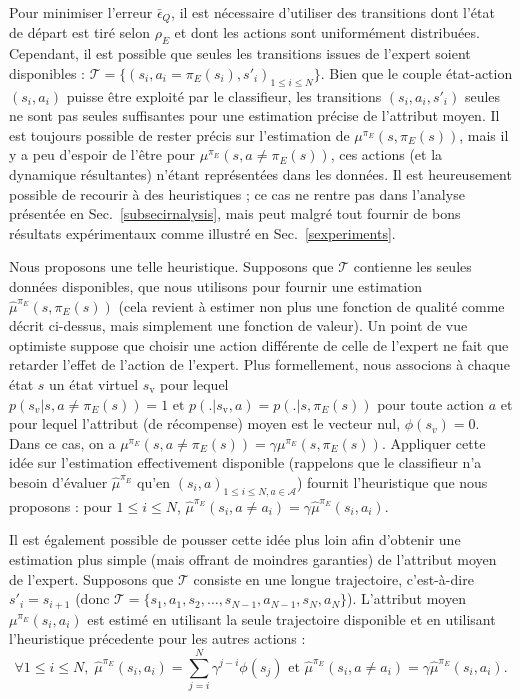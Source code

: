 \documentclass[french,utf8]{./hermes-journal}
\newcommand{\A}{\mathcal{A}}
\newcommand{\T}{\mathcal{T}}
\begin{document}
Pour minimiser l'erreur $\bar{\epsilon}_Q$, il est nécessaire d'utiliser des transitions dont l'état de départ est tiré selon 
$\rho_E$ et dont les actions sont uniformément distribuées. Cependant, il est possible que seules les transitions issues de l'expert soient disponibles : $\T =
\{(s_i,a_i=\pi_E(s_i),s'_i)_{1\leq i \leq N}\}$. Bien que le couple état-action $(s_i,a_i)$ puisse être exploité par le classifieur, les transitions $(s_i,a_i,s'_i)$ seules ne sont pas seules suffisantes pour une estimation précise de l'attribut moyen. Il est toujours possible de rester précis sur l'estimation de $\mu^{\pi_E}(s,\pi_E(s))$, mais il y a peu d'espoir de l'être pour $\mu^{\pi_E}(s,a\neq\pi_E(s))$, ces actions (et la dynamique résultantes) n'étant représentées dans les données. Il est heureusement possible de recourir à des heuristiques ; ce cas ne rentre pas dans l'analyse présentée en 
Sec.~\ref{subsecirnalysis}, mais peut malgré tout fournir de bons résultats expérimentaux comme illustré en Sec.~\ref{sexperiments}.


Nous proposons une telle heuristique. Supposons que  $\T$ contienne les seules données disponibles, que nous utilisons pour fournir une estimation 
$\hat{\mu}^{\pi_E}(s,\pi_E(s))$ (cela revient à estimer non plus une fonction de qualité comme décrit ci-dessus, mais simplement une fonction de valeur). Un point de vue optimiste suppose que choisir une action différente de celle de l'expert ne fait que retarder l'effet de l'action de l'expert. Plus formellement, nous associons à chaque état $s$ un état virtuel $s_\text{v}$ pour lequel $p(s_v|s,a\neq \pi_E(s))=1 \textrm{ et } p(.|s_\text{v},a)=p(.|s,\pi_E(s))$ pour toute action $a$ et pour lequel l'attribut (de récompense) moyen est le vecteur nul, $\phi(s_v) = 0$. Dans ce cas, on a
$\mu^{\pi_E}(s,a\neq\pi_E(s)) = \gamma \mu^{\pi_E}(s,\pi_E(s))$.
Appliquer cette idée sur l'estimation effectivement disponible (rappelons que le classifieur n'a besoin d'évaluer  $\hat{\mu}^{\pi_E}$ qu'en
$(s_i,a)_{1\leq i\leq N,a\in \A}$) fournit l'heuristique que nous proposons :
pour $1\leq i\leq N$, $\hat{\mu}^{\pi_E}(s_i,a\neq a_i) = \gamma
\hat{\mu}^{\pi_E}(s_i,a_i)$.

Il est également possible de pousser cette idée plus loin afin d'obtenir une estimation plus simple (mais offrant de moindres garanties) de l'attribut moyen de l'expert.
Supposons que  $\T$ consiste en une longue trajectoire, c'est-à-dire
$s'_i = s_{i+1}$ (donc $\T =
\{s_1,a_1,s_2,\dots,s_{N-1},a_{N-1},s_N,a_N\}$). L'attribut moyen 
$\mu^{\pi_E}(s_i,a_i)$ est estimé en utilisant la seule trajectoire disponible et en utilisant l'heuristique précedente pour les autres actions :
\begin{equation}
  \forall 1\leq i \leq N,\; \hat{\mu}^{\pi_E}(s_i,a_i) =
  \sum_{j=i}^N \gamma^{j-i}\phi(s_j) \text{ et }
  \hat{\mu}^{\pi_E}(s_i,a\neq a_i) = \gamma
  \hat{\mu}^{\pi_E}(s_i,a_i).
  \label{ec_plus_heuristic}
\end{equation}
\end{document}
